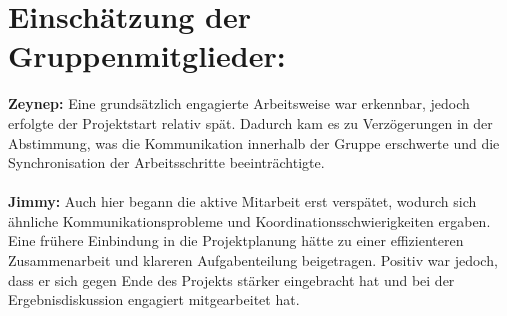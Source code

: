 \documentclass{article}
\begin{document}
\newpage 
\section{Einschätzung der Gruppenmitglieder:}
\textbf{Zeynep:} Eine grundsätzlich engagierte Arbeitsweise war erkennbar, jedoch erfolgte der Projektstart relativ spät. 
Dadurch kam es zu Verzögerungen in der Abstimmung, was die Kommunikation innerhalb der Gruppe erschwerte und 
die Synchronisation der Arbeitsschritte beeinträchtigte.\\
\mbox{} \\
\textbf{Jimmy:} Auch hier begann die aktive Mitarbeit erst verspätet, wodurch sich ähnliche Kommunikationsprobleme und
Koordinationsschwierigkeiten ergaben. Eine frühere Einbindung in die Projektplanung hätte zu einer
effizienteren Zusammenarbeit und klareren Aufgabenteilung beigetragen. Positiv war jedoch, dass er sich
gegen Ende des Projekts stärker eingebracht hat und bei der Ergebnisdiskussion engagiert mitgearbeitet hat.
\newpage
\end{document}
